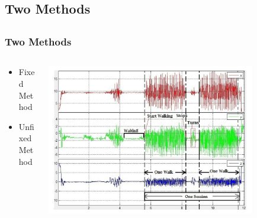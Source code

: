 \documentclass{beamer}
\begin{document}
\subsection{Two Methods}

\subsection{}
\begin{frame}
  \frametitle{Two Methods}
  \begin{columns}
  \begin{column}{0.4\textwidth}
  \begin{itemize}
    \item Fixed Method
  	\linebreak
  	\item Unfixed Method
  \end{itemize}
  \end{column}
  \begin{column}{0.8\textwidth}
   \includegraphics[width=0.8\textwidth]{Illustrations/gaitpatterns.png}
       \\
  \end{column}
  \end{columns}
\end{frame}
\end{document}
